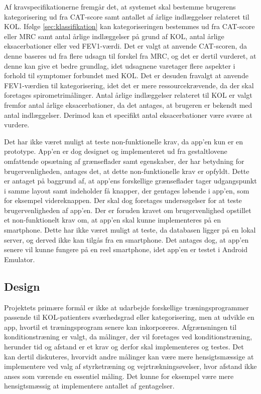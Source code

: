 Af kravspecifikationerne fremgår det, at systemet skal bestemme brugerens kategorisering ud fra CAT-score samt antallet af årlige indlæggelser relateret til KOL. Ifølge \autoref{sec:klassifikation} kan kategoriseringen bestemmes ud fra CAT-score eller MRC samt antal årlige indlæggelser på grund af KOL, antal årlige eksacerbationer eller ved FEV1-værdi. Det er valgt at anvende CAT-scoren, da denne baseres ud fra flere udsagn til forskel fra MRC, og det er dertil vurderet, at denne kan give et bedre grundlag, idet udsagnene varetager flere aspekter i forhold til symptomer forbundet med KOL. Det er desuden fravalgt at anvende FEV1-værdien til kategorisering, idet det er mere ressourcekrævende, da der skal foretages spirometrimålinger. Antal årlige indlæggelser relateret til KOL er valgt fremfor antal årlige eksacerbationer, da det antages, at brugeren er bekendt med antal indlæggelser. Derimod kan et specifikt antal eksacerbationer være svære at vurdere. 


Det har ikke været muligt at teste non-funktionelle krav, da app’en kun er en prototype. App’en er dog designet og implementeret ud fra gestaltlovene omfattende opsætning af grænseflader samt egenskaber, der har betydning for brugervenligheden, antages det, at dette non-funktionelle krav er opfyldt. Dette er antaget på baggrund af, at app'ens forskellige grænseflader tager udgangspunkt i samme layout samt indeholder få knapper, der gentages løbende i app’en, som for eksempel videreknappen. Der skal dog foretages undersøgelser for at teste brugervenligheden af app'en. Der er foruden kravet om brugervenlighed opstillet et non-funktionelt krav om, at app'en skal kunne implementeres på en smartphone. Dette har ikke været muligt at teste, da databasen ligger på en lokal server, og derved ikke kan tilgås fra en smartphone. Det antages dog, at app'en senere vil kunne fungere på en reel smartphone, idet app'en er testet i Android Emulator.

\subsection{Design}
Projektets primære formål er ikke at udarbejde forskellige træningsprogrammer passende til KOL-patienters sværhedsgrad eller kategorisering, men at udvikle en app, hvortil et træningsprogram senere kan inkorporeres. Afgrænsningen til konditionstræning er valgt, da målinger, der vil foretages ved konditionstræning, herunder tid og afstand er et krav og derfor skal implementeres og testes. Det kan dertil diskuteres, hvorvidt andre målinger kan være mere hensigtsmæssige at implementere ved valg af styrketræning og vejrtrækningsøvelser, hvor afstand ikke anses som værende en essentiel måling. Det kunne for eksempel være mere hensigtsmæssig at implementere antallet af gentagelser. 

